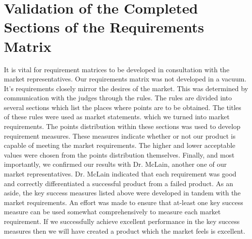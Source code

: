 \documentclass[]{auvsi_doc}
\begin{document}
\section{Validation of the Completed Sections of the Requirements Matrix}
It is vital for requirement matrices to be developed in consultation with the market representatives. Our requirements matrix was not developed in a vacuum. It's requirements closely mirror the desires of the market. This was determined by communication with the judges through the rules. The rules are divided into several sections which list the places where points are to be obtained. The titles of these rules were used as market statements. which we turned into market requirements. The points distribution within these sections was used to develop requirement measures. These measures indicate whether or not our product is capable of meeting the market requirements. The higher and lower acceptable values were chosen from the points distribution themselves. Finally, and most importantly, we confirmed our results with Dr. McLain, another one of our market representatives. Dr. McLain indicated that each requirement was good and correctly differentiated a successful product from a failed product. As an aside, the key success measures listed above were developed in tandem with the market requirements. An effort was made to ensure that at-least one key success measure can be used somewhat comprehensively to measure each market requirement. If we successfully achieve excellent performance in the key success measures then we will have created a product which the market feels is excellent.
\end{document}
